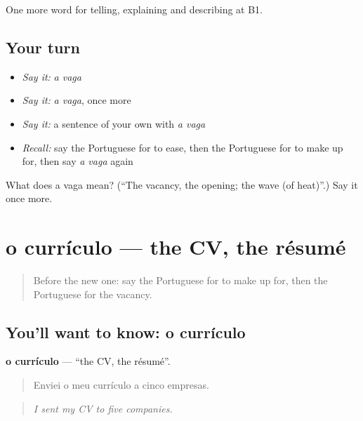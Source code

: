 \begin{grammarlens}[title={What you've built}]
One more word for telling, explaining and describing at B1.
\end{grammarlens}

\subsection*{Your turn}
\begin{itemize}
\raggedright
  \item \emph{Say it:} \emph{a vaga}
  \item \emph{Say it:} \emph{a vaga}, once more
  \item \emph{Say it:} a sentence of your own with \emph{a vaga}
  \item \emph{Recall:} say the Portuguese for to ease, then the Portuguese for to make up for, then say \emph{a vaga} again
\end{itemize}

\begin{tcolorbox}[breakable,colback=teal!4,colframe=teal!35!black,title={Before you move on}]
What does a vaga mean? (\textquotedblleft{}The vacancy, the opening; the wave (of heat)\textquotedblright{}.) Say it once more.
\end{tcolorbox}
\section[o currículo]{o currículo — the CV, the résumé}

\label{lesson:PT-C355-curriculo}



\begin{quote}
Before the new one: say the Portuguese for to make up for, then the Portuguese for the vacancy.
\end{quote}

\subsection*{You'll want to know: o currículo}
\textbf{o currículo} — \textquotedblleft{}the CV, the résumé\textquotedblright{}.

\begin{quote}
Enviei o meu currículo a cinco empresas.
\end{quote}

\begin{quote}
\emph{I sent my CV to five companies.}
\end{quote}

